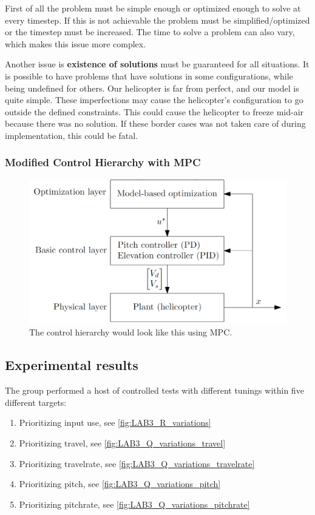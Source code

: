 \documentclass[../main.tex]{subfiles}
\begin{document}
First of all the problem must be simple enough or optimized enough to solve at every timestep. If this is not achievable the problem must be simplified/optimized or the timestep must be increased. The time to solve a problem can also vary, which makes this issue more complex.

Another issue is \textbf{existence of solutions} must be guaranteed for all situations. It is possible to have problems that have solutions in some configurations, while being undefined for others. Our helicopter is far from perfect, and our model is quite simple. These imperfections may cause the helicopter's configuration to go outside the defined constraints. This could cause the helicopter to freeze mid-air because there was no solution. If these border cases was not taken care of during implementation, this could be fatal.

\subsubsection{Modified Control Hierarchy with MPC}

\begin{figure}[h]
	\centering
	\includegraphics[width=0.7\linewidth]{content/MPC control hierarchy.png}
	\caption{The control hierarchy would look like this using MPC.}
\end{figure}

\subsection{Experimental results}\label{sec:lab3_result}
The group performed a host of controlled tests with different tunings within five different targets:
\begin{enumerate}
	\item Prioritizing input use, see \cref{fig:LAB3_R_variations}
	\item Prioritizing travel, see \cref{fig:LAB3_Q_variations_travel}
	\item Prioritizing travelrate, see \cref{fig:LAB3_Q_variations_travelrate}
	\item Prioritizing pitch, see \cref{fig:LAB3_Q_variations_pitch}
	\item Prioritizing pitchrate, see \cref{fig:LAB3_Q_variations_pitchrate}
\end{enumerate}
\end{document}
